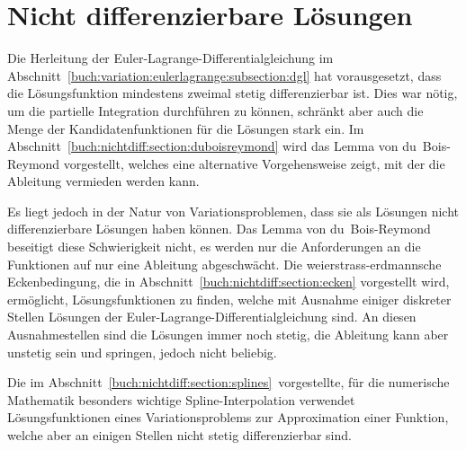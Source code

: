 %
%
%
\chapter{Nicht differenzierbare Lösungen
\label{buch:chapter:nichtdiff}}
Die Herleitung der Euler-Lagrange-Differentialgleichung im
Abschnitt~\ref{buch:variation:eulerlagrange:subsection:dgl}
hat vorausgesetzt,
dass die Lösungsfunktion mindestens zweimal stetig differenzierbar ist.
Dies war nötig, um die partielle Integration durchführen zu können,
schränkt aber auch die Menge der Kandidatenfunktionen für die Lösungen
stark ein.
Im Abschnitt~\ref{buch:nichtdiff:section:duboisreymond} wird 
das Lemma von du~Bois-Reymond vorgestellt, welches eine alternative
Vorgehensweise zeigt, mit der die Ableitung vermieden werden kann.

Es liegt jedoch in der Natur von Variationsproblemen, dass sie 
als Lösungen nicht differenzierbare Lösungen haben können.
Das Lemma von du~Bois-Reymond beseitigt diese Schwierigkeit
nicht, es werden nur die Anforderungen an die Funktionen auf 
nur eine Ableitung abgeschwächt.
Die weierstrass-erdmannsche Eckenbedingung, die in
Abschnitt~\ref{buch:nichtdiff:section:ecken} vorgestellt
wird, ermöglicht, Lösungsfunktionen zu finden, welche mit Ausnahme
einiger diskreter Stellen Lösungen der Euler-Lagrange-Differentialgleichung
sind.
An diesen Ausnahmestellen sind die Lösungen immer noch stetig, die
Ableitung kann aber unstetig sein und springen, jedoch nicht beliebig.

Die im Abschnitt~\ref{buch:nichtdiff:section:splines} vorgestellte,
für die numerische Mathematik besonders wichtige
Spline-Interpolation verwendet Lösungsfunktionen eines
Variationsproblems zur Approximation einer Funktion, welche aber an
einigen Stellen nicht stetig differenzierbar sind.






\uebungsabschnitt

\begin{uebungsaufgaben}
\end{uebungsaufgaben}
\enduebungsabschnitt

